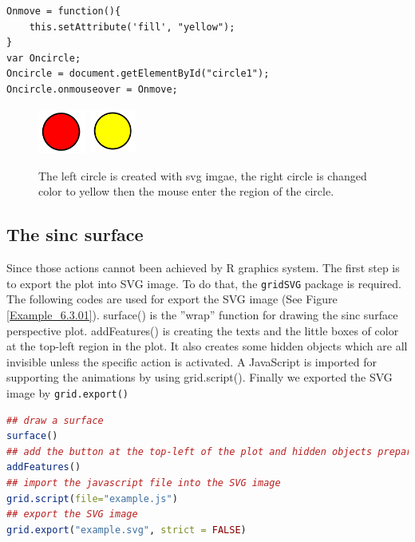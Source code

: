 \documentclass{report}
\begin{document}
\begin{lstlisting}
Onmove = function(){
    this.setAttribute('fill', "yellow");
}
var Oncircle;
Oncircle = document.getElementById("circle1");
Oncircle.onmouseover = Onmove;
\end{lstlisting}

\begin{figure}[h]
	\begin{center}
		\includegraphics[height = 1.45cm, width = 1.6cm]{figure/svg/svgdemo0.PNG}
		\hspace{4cm}
		\includegraphics[height = 1.5cm, width = 1.5cm]{figure/svg/svgdemo1.PNG}
		\caption{The left circle is created with svg imgae, the right circle is changed color to yellow then the mouse enter the region of the circle. }
		\label{Example_6.3.0}
	\end{center}
\end{figure}

\subsection{The sinc surface}
Since those actions cannot been achieved by R graphics system. The first step is to export the plot into
SVG image. To do that, the \texttt{gridSVG} package is required. The following codes are used for export the SVG image (See Figure \ref{Example_6.3.01}). surface() is the ''wrap'' function for drawing the sinc surface perspective plot.
addFeatures() is creating the texts and the little boxes of color at the top-left region in the plot.
It also creates some hidden objects which are all invisible unless the specific action is activated. A
JavaScript is imported for supporting the animations by using grid.script(). Finally we exported
the SVG image by \texttt{grid.export()}
\\

\begin{lstlisting}[language = R]
## draw a surface
surface()  
## add the button at the top-left of the plot and hidden objects prepare for animation
addFeatures() 
## import the javascript file into the SVG image
grid.script(file="example.js") 
## export the SVG image
grid.export("example.svg", strict = FALSE) 
\end{lstlisting}
\end{document}
